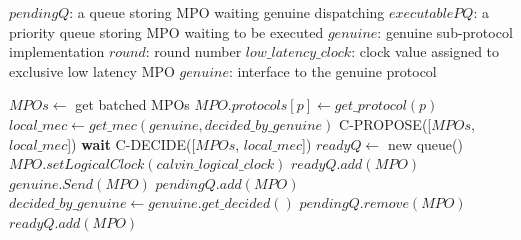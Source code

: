\documentclass[a4paper, 10pt]{article}
\newcommand{\IndentState}{\State\hspace{\algorithmicindent}}
\begin{document}
\begin{algorithmic}[1]
    \small
    \Variables
        \State $pendingQ$: a queue storing MPO waiting genuine dispatching
        \State $executablePQ$: a priority queue storing MPO waiting to be executed
        \State $genuine$: genuine sub-protocol implementation
        \State $round$: round number
        \State $low\_latency\_clock$: clock value assigned to exclusive low latency MPO
        \State $genuine$: interface to the genuine protocol
    \EndVariables

        \State $MPOs\gets$ get batched MPOs \label{alg:line:init}
                \State $MPO.protocols[p]\gets get\_protocol(p)$
            \EndFor
        \EndFor \label{alg:line:init:end}
        \State $local\_mec\gets get\_mec(genuine, decided\_by\_genuine)$
        \State
        \State C-PROPOSE([$MPOs$, $local\_mec$]) \label{alg:line:replication}
        \State \textbf{wait} C-DECIDE([$MPOs$, $local\_mec$]) \label{alg:line:replication:end}
        \State
        \State $readyQ \gets$ new queue()
                \State $MPO.setLogicalClock(calvin\_logical\_clock)$ \label{alg:line:clock_assign_calvin}
                \State $readyQ.add(MPO)$ \label{alg:line:clock_assign_calvin:end}
            \Else
                \State $genuine.Send(MPO)$\label{alg:line:genuine_dispatch}
                \State $pendingQ.add(MPO)$\label{alg:line:genuine_dispatch:end}
            \EndIf
        \EndFor
        \State
        \State $decided\_by\_genuine\gets genuine.get\_decided()$ \label{alg:line:clock_assign_genuine}
                \State $pendingQ.remove(MPO)$
                \State $readyQ.add(MPO)$
            \Else

\end{algorithmic}
\end{document}
